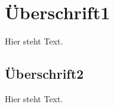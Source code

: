 \section{Überschrift1}
\label{Label1}

Hier steht Text.

\subsection{Überschrift2}
\label{Label2}

Hier steht Text.
